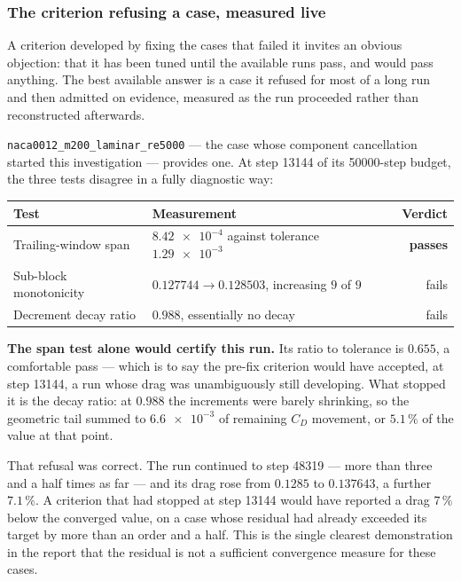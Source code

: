\subsubsection{The criterion refusing a case, measured live}
\label{sec:criterionworks}

A criterion developed by fixing the cases that failed it invites an obvious objection:
that it has been tuned until the available runs pass, and would pass anything. The best
available answer is a case it refused for most of a long run and then admitted on
evidence, measured as the run proceeded rather than reconstructed afterwards.

\texttt{naca0012\_m200\_laminar\_re5000} --- the case whose component cancellation
started this investigation --- provides one. At step \num{13144} of its \num{50000}-step
budget, the three tests disagree in a fully diagnostic way:

\begin{center}
\begin{tabular}{llr}
  \toprule
  Test & Measurement & Verdict \\
  \midrule
  Trailing-window span & $\num{8.42e-4}$ against tolerance $\num{1.29e-3}$
    & \textbf{passes} \\
  Sub-block monotonicity & $0.127744 \to 0.128503$, increasing $9$ of $9$
    & fails \\
  Decrement decay ratio & $0.988$, essentially no decay & fails \\
  \bottomrule
\end{tabular}
\end{center}

\noindent \textbf{The span test alone would certify this run.} Its ratio to tolerance is
$0.655$, a comfortable pass --- which is to say the pre-fix criterion would have accepted,
at step \num{13144}, a run whose drag was unambiguously still developing. What stopped it
is the decay ratio: at $0.988$ the increments were barely shrinking, so the geometric tail
summed to $\num{6.6e-3}$ of remaining $C_D$ movement, or $5.1\,\%$ of the value at that
point.

That refusal was correct. The run continued to step \num{48319} --- more than three and a
half times as far --- and its drag rose from $0.1285$ to $0.137643$, a further $7.1\,\%$.
A criterion that had stopped at step \num{13144} would have reported a drag $7\,\%$ below
the converged value, on a case whose residual had already exceeded its target by more than
an order and a half. This is the single clearest demonstration in the report that the
residual is not a sufficient convergence measure for these cases.

